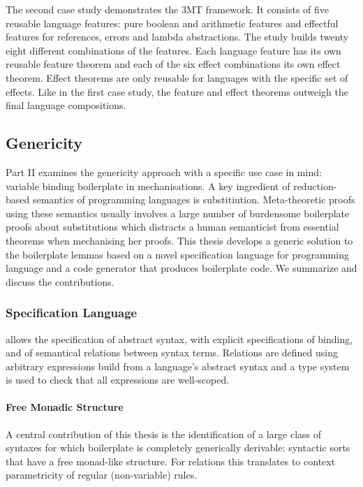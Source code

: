 The second case study demonstrates the 3MT framework. It consists of five
reusable language features: pure boolean and arithmetic features and effectful
features for references, errors and lambda abstractions. The study builds twenty
eight different combinations of the features. Each language feature has its own
reusable feature theorem and each of the six effect combinations its own effect
theorem. Effect theorems are only reusable for languages with the specific set
of effects. Like in the first case study, the feature and effect theorems
outweigh the final language compositions.



\subsection{Genericity}
Part II examines the genericity approach with a specific use case in mind:
variable binding boilerplate in mechanisations. A key ingredient of
reduction-based semantics of programming languages is substitiution.
Meta-theoretic proofs using these semantics usually involves a large number of
burdensome boilerplate proofs about substitutions which distracts a human
semanticist from essential theorems when mechanising her proofs. This thesis
develops a generic solution to the boilerplate lemmas based on a novel
specification language \Knot for programming language and a code generator
\Needle that produces boilerplate code. We summarize and discuss the
contributions.

\subsubsection{Specification Language}
\Knot allows the specification of abstract syntax, with explicit specifications
of binding, and of semantical relations between syntax terms. Relations are
defined using arbitrary expressions build from a language's abstract syntax and
a type system is used to check that all expressions are well-scoped.

\paragraph{Free Monadic Structure}
A central contribution of this thesis is the identification of a large class of
syntaxes for which boilerplate is completely generically derivable: syntactic
sorts that have a free monad-like structure. For relations this translates to
context parametricity of regular (non-variable) rules.

